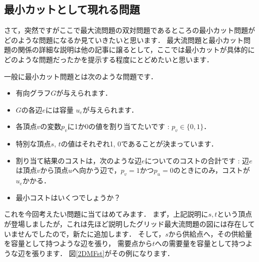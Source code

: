 \documentclass[13pt]{jarticle}
\begin{document}
\subsection{最小カットとして現れる問題}

さて，突然ですがここで最大流問題の双対問題であるところの最小カット問題がどのような問題になるか見ていきたいと思います．
最大流問題と最小カット問題の関係の詳細な説明は他の記事に譲るとして，ここでは最小カットが具体的にどのような問題だったかを提示する程度にとどめたいと思います．

一般に最小カット問題とは次のような問題です．
\begin{itemize}
\item 有向グラフ$G$が与えられます．
\item $G$の各辺$e$には容量 $u_e$が与えられます．
\item 各頂点$v$の変数$p_v$に1か0の値を割り当てたいです : $p_v \in \{0, 1\}$．
\item 特別な頂点$s$, $t$の値はそれぞれ1, 0であることが決まっています．
\item 割り当て結果のコストは，次のような辺$e$についてのコストの合計です : 辺$e$は頂点$v$から頂点$u$へ向かう辺で，$p_v=1$かつ$p_u=0$のときにのみ，コストが$u_e$かかる．
\item 最小コストはいくつでしょうか？
\end{itemize}


これを今回考えたい問題に当てはめてみます．
まず，上記説明に$s,t$という頂点が登場しましたが，これは先ほど説明したグリッド最大流問題の図には存在していませんでしたので，新たに追加します．
そして，$s$から供給点へ，その供給量を容量として持つような辺を張り，
需要点から$t$への需要量を容量として持つような辺を張ります．
図\ref{2DMFst}がその例になります．
\end{document}
